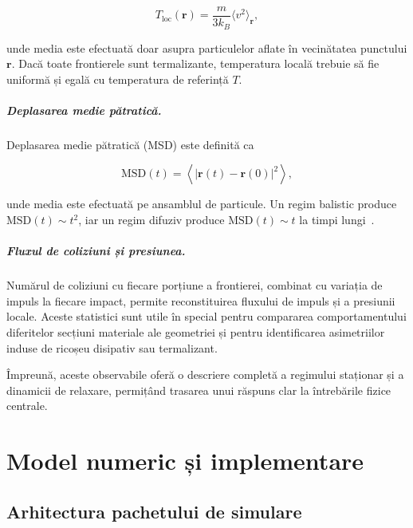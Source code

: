 \documentclass[12pt,openright,twoside]{book}
\begin{document}
\begin{equation}
    T_{\text{loc}}(\mathbf{r}) = \frac{m}{3k_B}\langle v^2 \rangle_{\mathbf{r}},
\end{equation}

unde media este efectuată doar asupra particulelor aflate în vecinătatea punctului $\mathbf{r}$. Dacă toate frontierele sunt termalizante, temperatura locală trebuie să fie uniformă și egală cu temperatura de referință $T$.

\paragraph{Deplasarea medie pătratică.}
Deplasarea medie pătratică (MSD) este definită ca

\begin{equation}
    \text{MSD}(t) = \left\langle \left|\mathbf{r}(t) - \mathbf{r}(0)\right|^2 \right\rangle,
    \label{eq:msd}
\end{equation}

unde media este efectuată pe ansamblul de particule. Un regim balistic produce $\text{MSD}(t)\sim t^2$, iar un regim difuziv produce $\text{MSD}(t)\sim t$ la timpi lungi~\cite{einstein1905,smoluchowski1906,kubo1991,michalet2010}.

\paragraph{Fluxul de coliziuni și presiunea.}
Numărul de coliziuni cu fiecare porțiune a frontierei, combinat cu variația de impuls la fiecare impact, permite reconstituirea fluxului de impuls și a presiunii locale. Aceste statistici sunt utile în special pentru compararea comportamentului diferitelor secțiuni materiale ale geometriei și pentru identificarea asimetriilor induse de ricoșeu disipativ sau termalizant.

Împreună, aceste observabile oferă o descriere completă a regimului staționar și a dinamicii de relaxare, permițând trasarea unui răspuns clar la întrebările fizice centrale.

\chapter{Model numeric și implementare}
\label{sec:model}

\section{Arhitectura pachetului de simulare}
\end{document}
